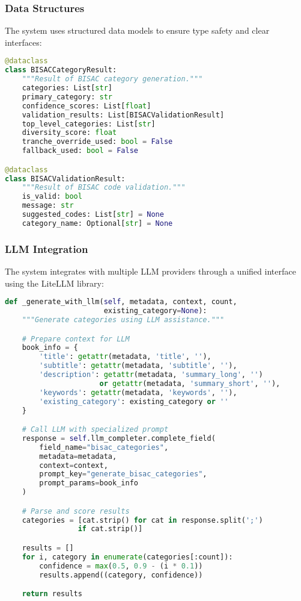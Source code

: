 \documentclass{article}
\begin{document}
\subsubsection{Data Structures}

The system uses structured data models to ensure type safety and clear interfaces:

\begin{lstlisting}[language=python, caption=Core Data Models]
@dataclass
class BISACCategoryResult:
    """Result of BISAC category generation."""
    categories: List[str]
    primary_category: str
    confidence_scores: List[float]
    validation_results: List[BISACValidationResult]
    top_level_categories: List[str]
    diversity_score: float
    tranche_override_used: bool = False
    fallback_used: bool = False

@dataclass
class BISACValidationResult:
    """Result of BISAC code validation."""
    is_valid: bool
    message: str
    suggested_codes: List[str] = None
    category_name: Optional[str] = None
\end{lstlisting}

\subsubsection{LLM Integration}

The system integrates with multiple LLM providers through a unified interface using the LiteLLM library:

\begin{lstlisting}[language=python, caption=LLM Provider Integration]
def _generate_with_llm(self, metadata, context, count,
                       existing_category=None):
    """Generate categories using LLM assistance."""

    # Prepare context for LLM
    book_info = {
        'title': getattr(metadata, 'title', ''),
        'subtitle': getattr(metadata, 'subtitle', ''),
        'description': getattr(metadata, 'summary_long', '')
                      or getattr(metadata, 'summary_short', ''),
        'keywords': getattr(metadata, 'keywords', ''),
        'existing_category': existing_category or ''
    }

    # Call LLM with specialized prompt
    response = self.llm_completer.complete_field(
        field_name="bisac_categories",
        metadata=metadata,
        context=context,
        prompt_key="generate_bisac_categories",
        prompt_params=book_info
    )

    # Parse and score results
    categories = [cat.strip() for cat in response.split(';')
                 if cat.strip()]

    results = []
    for i, category in enumerate(categories[:count]):
        confidence = max(0.5, 0.9 - (i * 0.1))
        results.append((category, confidence))

    return results
\end{lstlisting}
\end{document}
